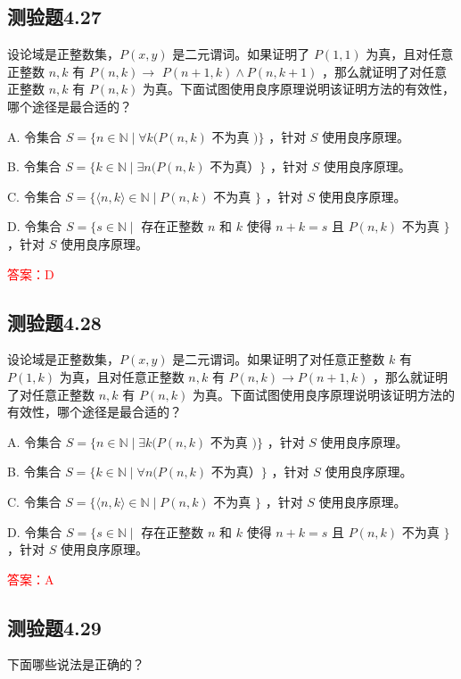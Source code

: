 \documentclass[UTF8, heading=true]{ctexart}
\begin{document}
\subsection{测验题4.27}

设论域是正整数集，$P(x, y)$ 是二元谓词。如果证明了 $P(1,1)$ 为真，且对任意正整数 $n, k$ 有 $P(n, k) \rightarrow$ $P(n+1, k) \wedge P(n, k+1)$ ，那么就证明了对任意正整数 $n, k$ 有 $P(n, k)$ 为真。下面试图使用良序原理说明该证明方法的有效性，哪个途径是最合适的？

A. 令集合 $S=\{n \in \mathbb{N} \mid \forall k(P(n, k)$ 不为真 $)\}$ ，针对 $S$ 使用良序原理。

B. 令集合 $S=\{k \in \mathbb{N} \mid \exists n(P(n, k)$ 不为真）$\}$ ，针对 $S$ 使用良序原理。

C. 令集合 $S=\{\langle n, k\rangle \in \mathbb{N} \mid P(n, k)$ 不为真 $\}$ ，针对 $S$ 使用良序原理。

D. 令集合 $S=\{s \in \mathbb{N} \mid$ 存在正整数 $n$ 和 $k$ 使得 $n+k=s$ 且 $P(n, k)$ 不为真 $\}$ ，针对 $S$ 使用良序原理。

\textcolor{red}{答案：D}

\subsection{测验题4.28}

设论域是正整数集，$P(x, y)$ 是二元谓词。如果证明了对任意正整数 $k$ 有 $P(1, k)$ 为真，且对任意正整数 $n, k$ 有 $P(n, k) \rightarrow P(n+1, k)$ ，那么就证明了对任意正整数 $n, k$ 有 $P(n, k)$ 为真。下面试图使用良序原理说明该证明方法的有效性，哪个途径是最合适的？

A. 令集合 $S=\{n \in \mathbb{N} \mid \exists k(P(n, k)$ 不为真 $)\}$ ，针对 $S$ 使用良序原理。

B. 令集合 $S=\{k \in \mathbb{N} \mid \forall n(P(n, k)$ 不为真）$\}$ ，针对 $S$ 使用良序原理。

C. 令集合 $S=\{\langle n, k\rangle \in \mathbb{N} \mid P(n, k)$ 不为真 $\}$ ，针对 $S$ 使用良序原理。

D. 
令集合 $S=\{s \in \mathbb{N} \mid$ 存在正整数 $n$ 和 $k$ 使得 $n+k=s$ 且 $P(n, k)$ 不为真 $\}$ ，针对 $S$ 使用良序原理。

\textcolor{red}{答案：A}

\subsection{测验题4.29}

下面哪些说法是正确的？
\end{document}
